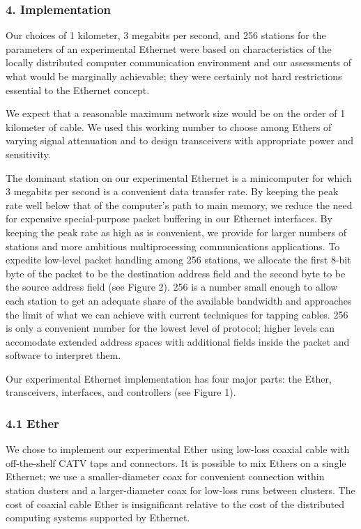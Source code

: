 \subsubsection*{4. Implementation}

Our choices of 1 kilometer, 3 megabits per second, and 256 stations for the parameters of an experimental Ethernet were based on characteristics of the locally distributed computer communication environment and our assessments of what would be marginally achievable; they were certainly not hard restrictions essential to the Ethernet concept.

We expect that a reasonable maximum network size would be on the order of 1 kilometer of cable. We used this working number to choose among Ethers of varying signal attenuation and to design transceivers with appropriate power and sensitivity.

The dominant station on our experimental Ethernet is a minicomputer for which 3 megabits per second is a convenient data transfer rate. By keeping the peak rate well below that of the computer's path to main memory, we reduce the need for expensive special-purpose packet buffering in our Ethernet interfaces. By keeping the peak rate as high as is convenient, we provide for larger numbers of stations and more ambitious multiprocessing communications applications.
To expedite low-level packet handling among 256 stations, we allocate the first 8-bit byte of the packet to be the destination address field and the second byte to be the source address field (see Figure 2). 256 is a number small enough to allow each station to get an adequate share of the available bandwidth and approaches the limit of what we can achieve with current techniques for tapping cables. 256 is only a convenient number for the lowest level of protocol; higher levels can accomodate extended address spaces with additional fields inside the packet and software to interpret them.

Our experimental Ethernet implementation has four major parts: the Ether, transceivers, interfaces, and controllers (see Figure 1).

\vspace{-6pt}
\subsubsection{4.1 Ether}
We chose to implement our experimental Ether using low-loss coaxial cable with off-the-shelf CATV taps and connectors. It is possible to mix Ethers on a single Ethernet; we use a smaller-diameter coax for convenient connection within station dusters and a larger-diameter coax for low-loss runs between clusters. The cost of coaxial cable Ether is insignificant relative to the cost of the distributed computing systems supported by Ethernet.

